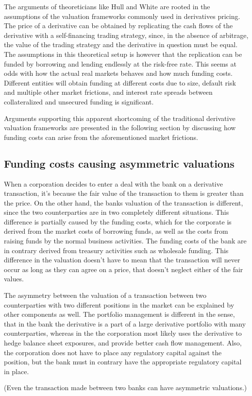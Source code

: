 \documentclass[../../../main.tex]{subfiles}
\begin{document}
        The arguments of theoreticians like Hull and White are rooted in the assumptions of the valuation frameworks commonly used in derivatives pricing.
        The price of a derivative can be obtained by replicating the cash flows of the derivative with a self-financing trading strategy, 
        since, in the absence of arbitrage, the value of the trading strategy and the derivative in question must be equal.
        The assumptions in this theoretical setup is however 
        that the replication can be funded by borrowing and lending endlessly at the risk-free rate.
        This seems at odds with how the actual real markets behaves and how much funding costs.
        Different entities will obtain funding at different costs due to size,
        default risk and multiple other market frictions,
        and interest rate spreads between collateralized and unsecured funding is significant.

        Arguments supporting this apparent shortcoming of the traditional derivative valuation frameworks are presented in the following section by discussing how funding costs can arise from the aforementioned market frictions.
    
    \subsection{Funding costs causing asymmetric valuations}
        When a corporation decides to enter a deal with the bank on a derivative transaction,
        it's because the fair value of the transaction to them is greater than the price.
        On the other hand, the banks valuation of the transaction is different,
        since the two counterparties are in two completely different situations.
        This difference is partially caused by the funding costs,
        which for the corporate is derived from the market costs of borrowing funds,
        as well as the costs from raising funds by the normal business activities.
        The funding costs of the bank are in contrary derived from treasury activities such as wholesale funding.
        This difference in the valuation doesn't have to mean that the transaction will never occur 
        as long as they can agree on a price, that doesn't neglect either of the fair values.

        The asymmetry between the valuation of a transaction between two counterparties with two different positions in the market can be explained by other components as well.
        The portfolio management is different in the sense,
        that in the bank the derivative is a part of a large derivative portfolio with many counterparties,
        whereas in the the corporation most likely uses the derivative to hedge balance sheet exposures,
        and provide better cash flow management.
        Also, the corporation does not have to place any regulatory capital against the position,
        but the bank must in contrary have the appropriate regulatory capital in place.

        (Even the transaction made between two banks can have asymmetric valuations.)
\end{document}
